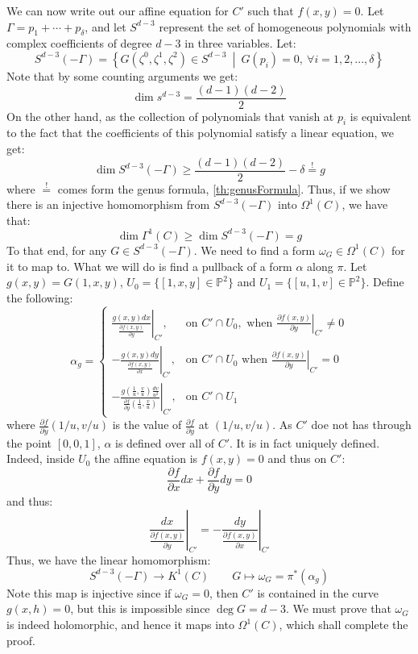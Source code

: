 \documentclass{book}
\renewcommand{\P}{{\mathbb{P}}}
\newcommand{\set}[2]{\left\{#1 \ \middle|\ #2\right\}}
\begin{document}
\begin{Proof}
  We can now write out our affine equation for $C'$ such that $f(x,y) = 0$. Let $\Gamma = p_1 + \cdots
  + p_\delta$, and let $S^{d-3}$ represent the set of homogeneous polynomials with complex coefficients of
  degree $d-3$ in three variables. Let:
  \[
    S^{d-3}(-\Gamma) = \set{G(\zeta^0, \zeta^1, \zeta^2) \in S^{d-3}}{G(p_i) = 0,\ \forall i  =1,2, ...,
    \delta}
  \]
  Note that by some counting arguments we get:
  \[
    \dim s^{d-3} = \frac{(d-1)(d-2)}{2}
  \]
  On the other hand, as the collection of polynomials that vanish at $p_i$ is equivalent to the fact that the
  coefficients of this polynomial satisfy a linear equation, we get:
  \[
    \dim S^{d-3}(-\Gamma) \ge \frac{(d-1)(d-2)}{2}-\delta \overset{!}{=} g
  \]
  where $\overset{!}{=}$ comes form the genus formula, \cref{th:genusFormula}. Thus, if we show there is an
  injective homomorphism from $S^{d-3}(-\Gamma)$ into $\Omega^1(C)$, we have that:
  \[
    \dim \Gamma^1(C) \ge \dim S^{d-3}(-\Gamma) = g
  \]
  To that end, for any $G \in S^{d-3}(-\Gamma)$. We need to find a form $\omega_G \in \Omega^1(C)$ for it to
  map to. What we will do is find a pullback of a form $\alpha$ along $\pi$. Let $g(x,y) = G(1,x,y)$, $U_0 =
  \{[1,x,y] \in \P^2\}$ and $U_1 = \{[u,1,v]\in \P^2\}$. Define the following:
  \[
    \alpha_g = \begin{cases}
      \left.\frac{g(x,y)dx}{\frac{\partial f(x,y)}{\partial y}}\right|_{C'}, & \text{on } C' \cap U_0, \text{ when
        } \left.\frac{\partial f(x,y)}{\partial y}\right|_{C'} \neq 0 \\[8pt]
      \left.-\frac{g(x,y)dy}{\frac{\partial f(x,y)}{\partial x}}\right|_{C'}, & \text{on } C' \cap U_0 \text{ when
        } \left.\frac{\partial f(x,y)}{\partial y}\right|_{C'} = 0 \\[8pt]
      \left.-\frac{g\left(\frac{1}{u}, \frac{v}{u}\right) \frac{dv}{u^2}}{\frac{\partial f}{\partial
        y}\left(\frac{1}{u}, \frac{v}{u}\right)}\right|_{C'}, & \text{on } C' \cap U_1
    \end{cases}
  \]
  where $\frac{\partial f}{\partial y}(1/u, v/u)$ is the value of $\frac{\partial f}{\partial y}$ at $(1/u,
  v/u)$. As $C'$ doe not has through the point $[0,0,1]$, $\alpha$ is defined over all of $C'$. It is in fact
  uniquely defined. Indeed, inside $U_0$ the affine equation is $f(x,y) = 0$ and thus on $C'$:
  \[
    \frac{\partial f}{\partial x}dx + \frac{\partial f}{\partial y}dy = 0
  \]
  and thus:
  \[
    \left.\frac{dx}{\frac{\partial f(x,y)}{\partial y}}\right|_{C'} = \left. -\frac{dy}{\frac{\partial
        f(x,y)}{\partial x}}\right|_{C'}
  \]
  Thus, we have the linear homomorphism:
  \[
    S^{d-3}(-\Gamma) \to K^1(C) \qquad G \mapsto \omega_G = \pi^*(\alpha_g)
  \]
  Note this map is injective since if $\omega_G = 0$, then $C'$ is contained in the curve $g(x,h) = 0$, but
  this is impossible since $\deg G = d-3$. We must prove that $\omega_G$ is indeed holomorphic, and hence it
  maps into $\Omega^1(C)$, which shall complete the proof.


\end{Proof}
\end{document}
